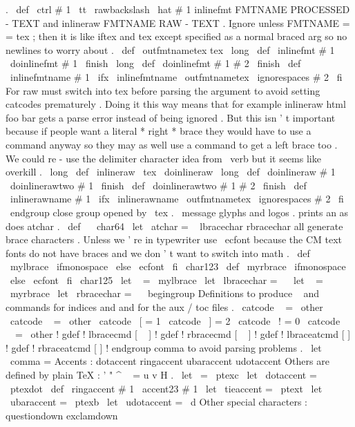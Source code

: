 {{.
\
def
\
ctrl
#
1
{
{
\
tt
\
rawbackslash
\
hat
}
#
1
}
%
inlinefmt
{
FMTNAME
PROCESSED
-
TEXT
}
and
inlineraw
{
FMTNAME
RAW
-
TEXT
}
.
%
Ignore
unless
FMTNAME
=
=
tex
;
then
it
is
like
iftex
and
tex
%
except
specified
as
a
normal
braced
arg
so
no
newlines
to
worry
about
.
%
\
def
\
outfmtnametex
{
tex
}
%
\
long
\
def
\
inlinefmt
#
1
{
\
doinlinefmt
#
1
\
finish
}
\
long
\
def
\
doinlinefmt
#
1
#
2
\
finish
{
%
\
def
\
inlinefmtname
{
#
1
}
%
\
ifx
\
inlinefmtname
\
outfmtnametex
\
ignorespaces
#
2
\
fi
}
%
For
raw
must
switch
into
tex
before
parsing
the
argument
to
avoid
%
setting
catcodes
prematurely
.
Doing
it
this
way
means
that
for
%
example
inlineraw
{
html
foo
{
bar
}
gets
a
parse
error
instead
of
being
%
ignored
.
But
this
isn
'
t
important
because
if
people
want
a
literal
%
*
right
*
brace
they
would
have
to
use
a
command
anyway
so
they
may
as
%
well
use
a
command
to
get
a
left
brace
too
.
We
could
re
-
use
the
%
delimiter
character
idea
from
\
verb
but
it
seems
like
overkill
.
%
\
long
\
def
\
inlineraw
{
\
tex
\
doinlineraw
}
\
long
\
def
\
doinlineraw
#
1
{
\
doinlinerawtwo
#
1
\
finish
}
\
def
\
doinlinerawtwo
#
1
#
2
\
finish
{
%
\
def
\
inlinerawname
{
#
1
}
%
\
ifx
\
inlinerawname
\
outfmtnametex
\
ignorespaces
#
2
\
fi
\
endgroup
%
close
group
opened
by
\
tex
.
}
\
message
{
glyphs
}
%
and
logos
.
%
prints
an
as
does
atchar
{
}
.
\
def
\
{
\
char64
}
\
let
\
atchar
=
\
%
{
}
lbracechar
{
}
rbracechar
{
}
all
generate
brace
characters
.
%
Unless
we
'
re
in
typewriter
use
\
ecfont
because
the
CM
text
fonts
do
%
not
have
braces
and
we
don
'
t
want
to
switch
into
math
.
\
def
\
mylbrace
{
{
\
ifmonospace
\
else
\
ecfont
\
fi
\
char123
}
}
\
def
\
myrbrace
{
{
\
ifmonospace
\
else
\
ecfont
\
fi
\
char125
}
}
\
let
\
{
=
\
mylbrace
\
let
\
lbracechar
=
\
{
\
let
\
}
=
\
myrbrace
\
let
\
rbracechar
=
\
}
\
begingroup
%
Definitions
to
produce
\
{
and
\
}
commands
for
indices
%
and
{
and
}
for
the
aux
/
toc
files
.
\
catcode
\
{
=
\
other
\
catcode
\
}
=
\
other
\
catcode
\
[
=
1
\
catcode
\
]
=
2
\
catcode
\
!
=
0
\
catcode
\
\
=
\
other
!
gdef
!
lbracecmd
[
\
{
]
%
!
gdef
!
rbracecmd
[
\
}
]
%
!
gdef
!
lbraceatcmd
[
{
]
%
!
gdef
!
rbraceatcmd
[
}
]
%
!
endgroup
%
comma
{
}
to
avoid
parsing
problems
.
\
let
\
comma
=
%
Accents
:
dotaccent
ringaccent
ubaraccent
udotaccent
%
Others
are
defined
by
plain
TeX
:
'
"
^
~
=
u
v
H
.
\
let
\
=
\
ptexc
\
let
\
dotaccent
=
\
ptexdot
\
def
\
ringaccent
#
1
{
{
\
accent23
#
1
}
}
\
let
\
tieaccent
=
\
ptext
\
let
\
ubaraccent
=
\
ptexb
\
let
\
udotaccent
=
\
d
%
Other
special
characters
:
questiondown
exclamdown
}}}
